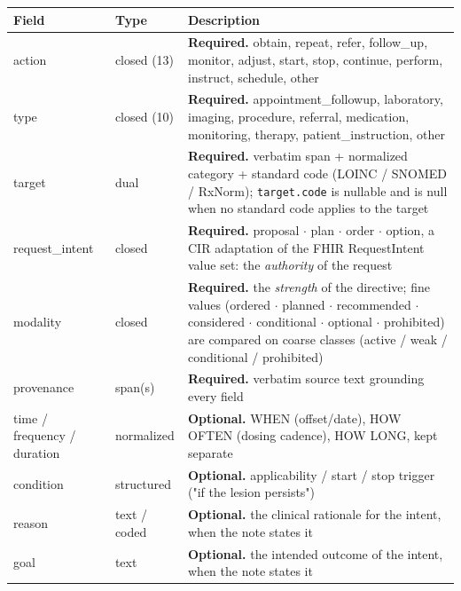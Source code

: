 \begin{table}[ht]
\centering
\small\setlength{\tabcolsep}{4pt}%
\setlength{\tabcolsep}{4pt}
\begin{tabularx}{\linewidth}{>{\hsize=0.536\hsize\raggedright\arraybackslash}X >{\hsize=0.515\hsize\raggedright\arraybackslash}X >{\hsize=1.950\hsize\raggedright\arraybackslash}X}
\toprule
Field & Type & Description \\
\midrule
action & closed (13) & \textbf{Required.} obtain, repeat, refer, follow\_\allowbreak{}up, monitor, adjust, start, stop, continue, perform, instruct, schedule, other \\
type & closed (10) & \textbf{Required.} appointment\_\allowbreak{}followup, laboratory, imaging, procedure, referral, medication, monitoring, therapy, patient\_\allowbreak{}instruction, other \\
target & dual & \textbf{Required.} verbatim span + normalized category + standard code (LOINC / SNOMED / RxNorm); \texttt{target.code} is nullable and is null when no standard code applies to the target \\
request\_\allowbreak{}intent & closed & \textbf{Required.} proposal $\cdot$ plan $\cdot$ order $\cdot$ option, a CIR adaptation of the FHIR RequestIntent value set: the \emph{authority} of the request \\
modality & closed & \textbf{Required.} the \emph{strength} of the directive; fine values (ordered $\cdot$ planned $\cdot$ recommended $\cdot$ considered $\cdot$ conditional $\cdot$ optional $\cdot$ prohibited) are compared on coarse classes (active / weak / conditional / prohibited) \\
provenance & span(s) & \textbf{Required.} verbatim source text grounding every field \\
time / frequency / duration & normalized & \textbf{Optional.} WHEN (offset/date), HOW OFTEN (dosing cadence), HOW LONG, kept separate \\
condition & structured & \textbf{Optional.} applicability / start / stop trigger ("if the lesion persists") \\
reason & text / coded & \textbf{Optional.} the clinical rationale for the intent, when the note states it \\
goal & text & \textbf{Optional.} the intended outcome of the intent, when the note states it \\
\bottomrule
\end{tabularx}
\end{table}

